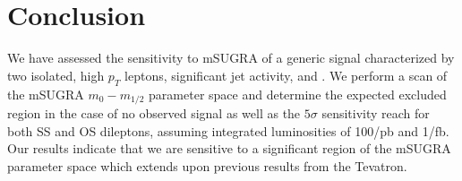 \section{Conclusion}
\label{sec:conclusion}

We have assessed the sensitivity to mSUGRA of a generic signal characterized by two isolated, high $p_T$ leptons,
significant jet activity, and \met. We perform a scan of the mSUGRA $m_{0}-m_{1/2}$ parameter space and determine 
the expected excluded region in the case of no observed signal as well as the $5\sigma$ sensitivity reach for both SS
and OS dileptons, assuming integrated luminosities of 100/pb and 1/fb. Our results indicate that we are sensitive to a
significant region of the mSUGRA parameter space which extends upon previous results from the Tevatron. 


